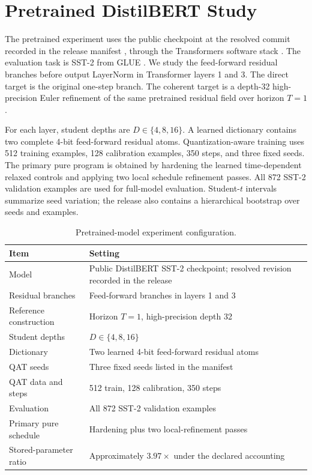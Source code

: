 \documentclass[twoside,11pt]{article}
\begin{document}
\section{Pretrained DistilBERT Study}
\label{app:pretrained-experiment}

The pretrained experiment uses the public
 checkpoint at the
resolved commit recorded in the release manifest
\citep{SanhEtAl2019DistilBERT,HuggingFaceDistilBERTSST2}, through the
Transformers software stack \citep{WolfEtAl2020Transformers}.  The evaluation
task is SST-2 from GLUE \citep{WangEtAl2019GLUE,SocherEtAl2013SST}.  We study
the feed-forward residual branches before output LayerNorm in Transformer
layers 1 and 3.  The direct target is the original one-step branch.  The
coherent target is a depth-32 high-precision Euler refinement of the same
pretrained residual field over horizon $T=1$.

For each layer, student depths are $D\in\{4,8,16\}$.  A learned dictionary
contains two complete 4-bit feed-forward residual atoms.  Quantization-aware
training uses 512 training examples, 128 calibration examples, 350 steps, and
three fixed seeds.  The primary pure program is obtained by hardening the
learned time-dependent relaxed controls and applying two local schedule
refinement passes.  All 872 SST-2 validation examples are used for full-model
evaluation.  Student-$t$ intervals summarize seed variation; the release also
contains a hierarchical bootstrap over seeds and examples.

\begin{table}[ht]
\centering
\caption{Pretrained-model experiment configuration.}
\label{tab:pretrained-settings}
\small
\begin{tabularx}{\linewidth}{@{}Y{.23\linewidth}X@{}}
\toprule
Item & Setting\\
\midrule
Model & Public DistilBERT SST-2 checkpoint; resolved revision recorded in the release\\
Residual branches & Feed-forward branches in layers 1 and 3\\
Reference construction & Horizon $T=1$, high-precision depth 32\\
Student depths & $D\in\{4,8,16\}$\\
Dictionary & Two learned 4-bit feed-forward residual atoms\\
QAT seeds & Three fixed seeds listed in the manifest\\
QAT data and steps & 512 train, 128 calibration, 350 steps\\
Evaluation & All 872 SST-2 validation examples\\
Primary pure schedule & Hardening plus two local-refinement passes\\
Stored-parameter ratio & Approximately $3.97\times$ under the declared accounting\\
\bottomrule
\end{tabularx}
\end{table}
\end{document}
